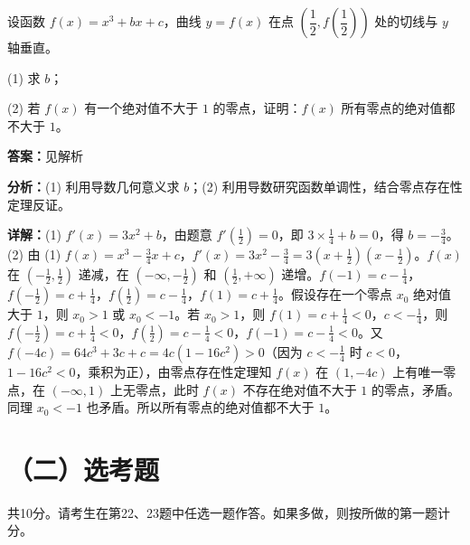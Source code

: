 \begin{question}[points=12]
设函数 $f(x)=x^3+bx+c$，曲线 $y=f(x)$ 在点 $\left(\dfrac12,f\left(\dfrac12\right)\right)$ 处的切线与 $y$ 轴垂直。

(1) 求 $b$；

(2) 若 $f(x)$ 有一个绝对值不大于 $1$ 的零点，证明：$f(x)$ 所有零点的绝对值都不大于 $1$。
\begin{solution}
\textbf{答案：}见解析

\textbf{分析：}(1) 利用导数几何意义求 $b$；(2) 利用导数研究函数单调性，结合零点存在性定理反证。

\textbf{详解：}(1) $f'(x)=3x^2+b$，由题意 $f'\left(\frac12\right)=0$，即 $3\times\frac14+b=0$，得 $b=-\frac34$。
(2) 由 (1) $f(x)=x^3-\frac34x+c$，$f'(x)=3x^2-\frac34=3\left(x+\frac12\right)\left(x-\frac12\right)$。$f(x)$ 在 $\left(-\frac12,\frac12\right)$ 递减，在 $\left(-\infty,-\frac12\right)$ 和 $\left(\frac12,+\infty\right)$ 递增。$f(-1)=c-\frac14$，$f\left(-\frac12\right)=c+\frac14$，$f\left(\frac12\right)=c-\frac14$，$f(1)=c+\frac14$。假设存在一个零点 $x_0$ 绝对值大于 $1$，则 $x_0>1$ 或 $x_0<-1$。若 $x_0>1$，则 $f(1)=c+\frac14<0$，$c<-\frac14$，则 $f\left(-\frac12\right)=c+\frac14<0$，$f\left(\frac12\right)=c-\frac14<0$，$f(-1)=c-\frac14<0$。又 $f(-4c)=64c^3+3c+c=4c(1-16c^2)>0$（因为 $c<-\frac14$ 时 $c<0$，$1-16c^2<0$，乘积为正），由零点存在性定理知 $f(x)$ 在 $(1,-4c)$ 上有唯一零点，在 $(-\infty,1)$ 上无零点，此时 $f(x)$ 不存在绝对值不大于 $1$ 的零点，矛盾。同理 $x_0<-1$ 也矛盾。所以所有零点的绝对值都不大于 $1$。
\end{solution}
\end{question}

\section*{（二）选考题}
共10分。请考生在第22、23题中任选一题作答。如果多做，则按所做的第一题计分。

